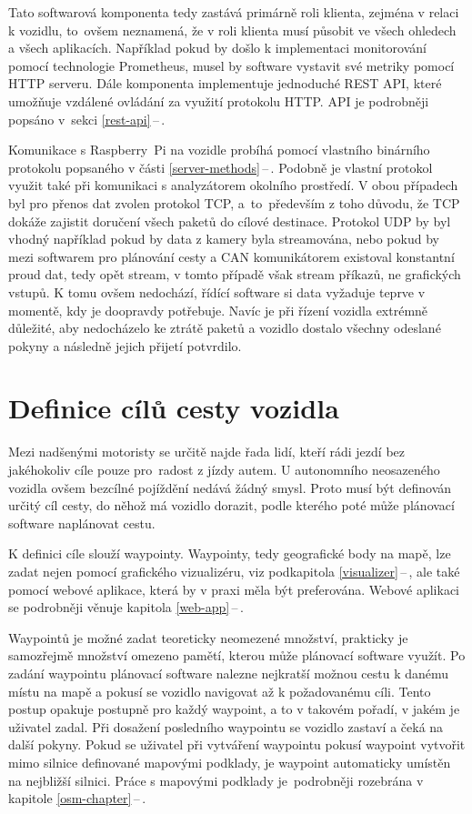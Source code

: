 \documentclass[czech, bachelor]{diploma}
\newcommand{\filipref}[1]{\ref{#1}\,--\,\nameref{#1}}
\begin{document}
Tato softwarová komponenta tedy zastává primárně roli klienta, zejména v relaci k vozidlu, to~ovšem neznamená, že v roli klienta
musí působit ve všech ohledech a všech aplikacích. Například pokud by došlo k implementaci monitorování pomocí technologie
Prometheus, musel by software vystavit své metriky pomocí HTTP serveru. Dále komponenta implementuje jednoduché REST API, které
umožňuje vzdálené ovládání za využití protokolu HTTP. API je podrobněji popsáno v~sekci \filipref{rest-api}.

Komunikace s Raspberry~Pi na vozidle probíhá pomocí vlastního binárního protokolu popsaného v části \filipref{server-methods}.
Podobně je vlastní protokol využit také při komunikaci s analyzátorem okolního prostředí. V obou případech byl pro přenos dat
zvolen protokol TCP, a~to~především z toho důvodu, že TCP dokáže zajistit doručení všech paketů do cílové destinace. Protokol UDP
by byl vhodný například pokud by data z kamery byla streamována, nebo pokud by mezi softwarem pro plánování cesty a CAN
komunikátorem existoval konstantní proud dat, tedy opět stream, v tomto případě však stream příkazů, ne grafických vstupů. K tomu
ovšem nedochází, řídící software si data vyžaduje teprve v momentě, kdy je doopravdy potřebuje. Navíc je při řízení vozidla
extrémně důležité, aby nedocházelo ke ztrátě paketů a vozidlo dostalo všechny odeslané pokyny a následně jejich přijetí potvrdilo.

\section{Definice cílů cesty vozidla} \label{target-definition}

Mezi nadšenými motoristy se určitě najde řada lidí, kteří rádi jezdí bez jakéhokoliv cíle pouze pro~radost z jízdy autem.
U autonomního neosazeného vozidla ovšem bezcílné pojíždění nedává žádný smysl. Proto musí být definován určitý cíl cesty, do něhož
má vozidlo dorazit, podle kterého poté může plánovací software naplánovat cestu.

K definici cíle slouží waypointy. Waypointy, tedy geografické body na mapě, lze zadat nejen pomocí grafického vizualizéru,
viz podkapitola \filipref{visualizer}, ale také pomocí webové aplikace, která by v praxi měla být preferována. Webové aplikaci
se podrobněji věnuje kapitola \filipref{web-app}.

Waypointů je možné zadat teoreticky neomezené množství, prakticky je samozřejmě množství omezeno pamětí, kterou může plánovací
software využít. Po zadání waypointu plánovací software nalezne nejkratší možnou cestu k danému místu na mapě a pokusí se vozidlo
navigovat až k požadovanému cíli. Tento postup opakuje postupně pro každý waypoint, a to v takovém pořadí, v jakém je uživatel
zadal. Při dosažení posledního waypointu se vozidlo zastaví a čeká na další pokyny. Pokud se uživatel při vytváření waypointu
pokusí waypoint vytvořit mimo silnice definované mapovými podklady, je waypoint automaticky umístěn na nejbližší silnici.
Práce s mapovými podklady je~podrobněji rozebrána v kapitole \filipref{osm-chapter}.
\end{document}
